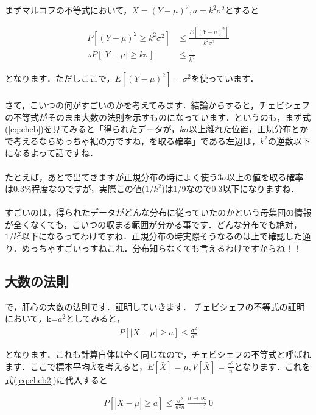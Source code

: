 \documentclass[11pt,a4paper,uplatex]{ujreport} 	%
\begin{document}
まずマルコフの不等式において，$X=(Y-\mu)^2, a = k^2\sigma^2$とすると

\begin{align}
  P[(Y-\mu)^2 \geq k^2\sigma^2] &\leq \frac{E[(Y-\mu)^2]}{k^2\sigma^2}\\
  \therefore P[|Y-\mu| \geq k\sigma] &\leq \frac{1}{k^2}
\end{align}

となります．ただしここで，$E[(Y-\mu)^2]=\sigma^2$を使っています．\\\\

さて，こいつの何がすごいのかを考えてみます．結論からすると，チェビシェフの不等式がそのまま大数の法則を示すものになっています．というのも，まず式(\ref{eq:cheb})を見てみると「得られたデータが，$k\sigma$以上離れた位置，正規分布とかで考えるならめっちゃ裾の方ですね，を取る確率」である左辺は，$k^2$の逆数以下になるよって話ですね．\\
\\

たとえば，あとで出てきますが正規分布の時によく使う$3\sigma$以上の値を取る確率は0.3\%程度なのですが，実際この値($1/k^2$)は1/9なので0.3以下になりますね．\\
\\

すごいのは，得られたデータがどんな分布に従っていたのかという母集団の情報が全くなくても，こいつの収まる範囲が分かる事です．どんな分布でも絶対，$1/k^2$以下になるってわけですね．正規分布の時実際そうなるのは上で確認した通り．めっちゃすごいっすねこれ．分布知らなくても言えるわけですからね！！

\subsection{大数の法則}
で，肝心の大数の法則です．証明していきます．
チェビシェフの不等式の証明において，k=$a^2$としてみると，
\begin{align}
  P[|X-\mu| \geq a] \leq \frac{\sigma^2}{a^2}
  \label{eq:cheb2}
\end{align}

となります．これも計算自体は全く同じなので，チェビシェフの不等式と呼ばれます．ここで標本平均$\bar{X}$を考えると，$E[\bar{X}] = \mu, V[\bar{X}] = \frac{\sigma^2}{n}$となります．これを式(\ref{eq:cheb2})に代入すると

\begin{align}
  P[|\bar{X}-\mu|\geq a] \leq \frac{\sigma^2}{a^2n}　\xrightarrow{n\rightarrow\infty}0
\end{align}
\end{document}
